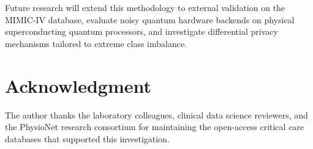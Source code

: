 \documentclass[conference]{IEEEtran}
\begin{document}
Future research will extend this methodology to external validation on the MIMIC-IV database, evaluate noisy quantum hardware backends on physical superconducting quantum processors, and investigate differential privacy mechanisms tailored to extreme class imbalance.

\section*{Acknowledgment}
The author thanks the laboratory colleagues, clinical data science reviewers, and the PhysioNet research consortium for maintaining the open-access critical care databases that supported this investigation.



\end{document}
